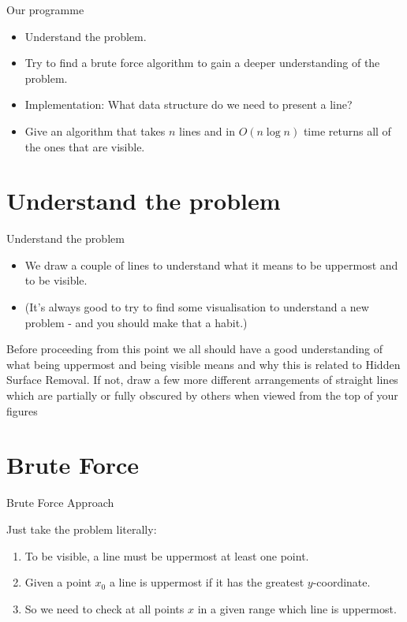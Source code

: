 \documentclass[ignorenonframetext,]{beamer}
\providecommand{\tightlist}{%
  \setlength{\itemsep}{0pt}\setlength{\parskip}{0pt}}
\begin{document}
\begin{frame}

\begin{block}{Our programme}

\begin{itemize}[<+->]
\tightlist
\item
  Understand the problem.
\item
  Try to find a brute force algorithm to gain a deeper understanding of the problem.
 \item
  Implementation: What data structure do we need to present a line?
\item
  Give an algorithm that takes \(n\) lines and in \(O(n\log n)\) time
  returns all of the ones that are visible.
\end{itemize}

\end{block}

\end{frame}

\section{Understand the problem}

\begin{frame}{Understand the problem}

\begin{itemize}
    \item We draw a couple of lines to understand what it means to be uppermost and to be visible. 
    \item (It's always good to try to find some visualisation to understand a new problem - and you should make that a habit.)
\end{itemize}
    
Before proceeding from this point we all should have a good understanding of what being uppermost and being visible means and why this is related to Hidden Surface Removal. If not, draw a few more different arrangements of straight lines which are partially or fully obscured by others when viewed from the top of your figures
\end{frame}

\section{Brute Force}

\begin{frame}{Brute Force Approach}

Just take the problem literally:
\begin{enumerate}
    \item To be visible, a line must be uppermost at least one point.
    \item Given a point $x_0$ a line is uppermost if it has the greatest $y$-coordinate.
    \item So we need to check at all points $x$ in a given range which line is uppermost.
\end{enumerate}
\end{frame}
\end{document}
